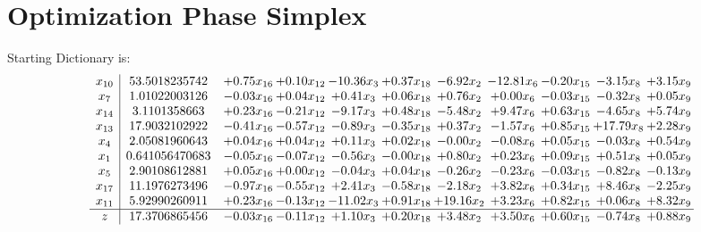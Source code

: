 \documentclass[9pt]{article}
\begin{document}
\section{Optimization Phase Simplex}
Starting Dictionary is:
\[\begin{array}{c| c c@{\hskip 2pt} c@{\hskip 2pt} c@{\hskip 2pt} c@{\hskip 2pt} c@{\hskip 2pt} c@{\hskip 2pt} c@{\hskip 2pt} c@{\hskip 2pt} c@{\hskip 2pt} }
 x_{10}   &  53.5018235742 & +  0.75 x_{16} & +  0.10 x_{12} & -10.36 x_{3} & +  0.37 x_{18} & -6.92 x_{2} & -12.81 x_{6} & -0.20 x_{15} & -3.15 x_{8} & +  3.15 x_{9}\\
 x_{7}   &  1.01022003126 & -0.03 x_{16} & +  0.04 x_{12} & +  0.41 x_{3} & +  0.06 x_{18} & +  0.76 x_{2} & +  0.00 x_{6} & -0.03 x_{15} & -0.32 x_{8} & +  0.05 x_{9}\\
 x_{14}   &  3.1101358663 & +  0.23 x_{16} & -0.21 x_{12} & -9.17 x_{3} & +  0.48 x_{18} & -5.48 x_{2} & +  9.47 x_{6} & +  0.63 x_{15} & -4.65 x_{8} & +  5.74 x_{9}\\
 x_{13}   &  17.9032102922 & -0.41 x_{16} & -0.57 x_{12} & -0.89 x_{3} & -0.35 x_{18} & +  0.37 x_{2} & -1.57 x_{6} & +  0.85 x_{15} & + 17.79 x_{8} & +  2.28 x_{9}\\
 x_{4}   &  2.05081960643 & +  0.04 x_{16} & +  0.04 x_{12} & +  0.11 x_{3} & +  0.02 x_{18} & -0.00 x_{2} & -0.08 x_{6} & +  0.05 x_{15} & -0.03 x_{8} & +  0.54 x_{9}\\
 x_{1}   &  0.641056470683 & -0.05 x_{16} & -0.07 x_{12} & -0.56 x_{3} & -0.00 x_{18} & +  0.80 x_{2} & +  0.23 x_{6} & +  0.09 x_{15} & +  0.51 x_{8} & +  0.05 x_{9}\\
 x_{5}   &  2.90108612881 & +  0.05 x_{16} & +  0.00 x_{12} & -0.04 x_{3} & +  0.04 x_{18} & -0.26 x_{2} & -0.23 x_{6} & -0.03 x_{15} & -0.82 x_{8} & -0.13 x_{9}\\
 x_{17}   &  11.1976273496 & -0.97 x_{16} & -0.55 x_{12} & +  2.41 x_{3} & -0.58 x_{18} & -2.18 x_{2} & +  3.82 x_{6} & +  0.34 x_{15} & +  8.46 x_{8} & -2.25 x_{9}\\
 x_{11}   &  5.92990260911 & +  0.23 x_{16} & -0.13 x_{12} & -11.02 x_{3} & +  0.91 x_{18} & + 19.16 x_{2} & +  3.23 x_{6} & +  0.82 x_{15} & +  0.06 x_{8} & +  8.32 x_{9}\\
\hline
z    &  17.3706865456 & -0.03 x_{16} & -0.11 x_{12} & +  1.10 x_{3} & +  0.20 x_{18} & +  3.48 x_{2} & +  3.50 x_{6} & +  0.60 x_{15} & -0.74 x_{8} & +  0.88 x_{9}\\
\end{array}\]
\end{document}
